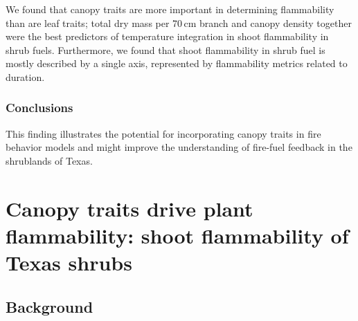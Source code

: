 \documentclass{ttuthes2007}
\begin{document}
\noindent We found that canopy traits are more important in determining flammability than are leaf traits; total dry mass per 70\,cm branch and canopy density together were the best predictors of temperature integration in shoot flammability in shrub fuels. Furthermore, we found that shoot flammability in shrub fuel is mostly described by a single axis, represented by flammability metrics related to duration.

\subsection*{\textbf{Conclusions}}
\noindent This finding illustrates the potential for incorporating canopy traits in fire behavior models and might improve the understanding of fire-fuel feedback in the shrublands of Texas.
 
 




\mainmatter



\chapter{Canopy traits drive plant flammability: shoot flammability of Texas shrubs}

\section*{\textbf{Background}}
\end{document}
